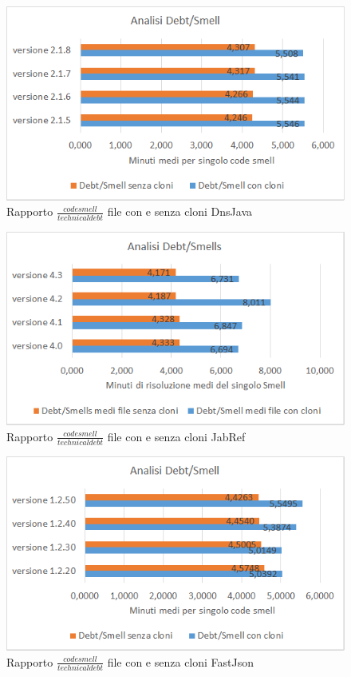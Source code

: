\begin{figure}[h]
	\centering
	\includegraphics[scale=0.75, trim = 0cm 0cm 0cm 0cm, clip=true]{Grafici_dnsJava/Debt-Smell.png}
	\caption{Rapporto $\frac{code smell}{technical debt}$ file con e senza cloni DnsJava}
	\label{fig:rapDnsJava}	
\end{figure}
\begin{figure}[h]
	\centering
	\includegraphics[scale=0.75, trim = 0cm 0cm 0cm 0cm, clip=true]{Grafici_jabRef/Debt-Smells.png}
	\caption{Rapporto $\frac{code smell}{technical debt}$ file con e senza cloni JabRef}
	\label{fig:rapJabRef}
\end{figure}
\begin{figure}[h]
	\centering
	\includegraphics[scale=0.75, trim = 0cm 0cm 0cm 0cm, clip=true]{Grafici_fastJson/Debt-Smell.png}
	\caption{Rapporto $\frac{code smell}{technical debt}$ file con e senza cloni FastJson}
	\label{fig:rapFastjson}
\end{figure}
